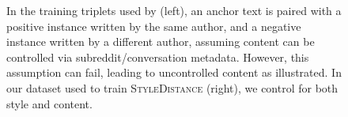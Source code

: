 {\begin{figure}[!ht]
\begin{tabular}{m{}m{}m{}m{}m{}}
    \bottomrule[\heavyrulewidth]
    \end{tabular}
    \caption{
    In the training triplets used by \citet{styleemb} (left), an anchor text is paired with a positive instance written by the same author, and a negative instance written by a different author, assuming content can be controlled via subreddit/conversation metadata. However, this assumption can fail, leading to uncontrolled content as illustrated. In our dataset used to train \textsc{StyleDistance}  (right), we control for both style and content.
    } 
    \label{figure:wegmannvsstyledistance}
    \end{figure}
}





